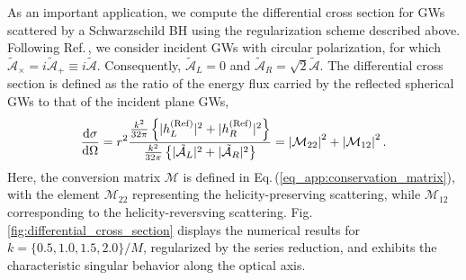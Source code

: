 \documentclass[reprint,amsmath,amssymb,aps,prd]{revtex4-2}
\newcommand{\dd}[0]{\mathrm{d}}
\begin{document}
\begin{widetext}
As an important application, we compute the differential cross section for GWs scattered by a Schwarzschild BH using the regularization scheme described above. Following Ref.\,\cite{Dolan_2008a}, we consider incident GWs with circular polarization, for which $\tilde{\mathcal{A}}_{\times}=i\tilde{\mathcal{A}}_{+}\equiv i\tilde{\mathcal{A}}$. Consequently, $\tilde{\mathcal{A}}_{L}=0$ and $\tilde{\mathcal{A}}_{R}=\sqrt{2}\tilde{\mathcal{A}}$. 
The differential cross section is defined as the ratio of the energy flux carried by the reflected spherical GWs to that of the incident plane GWs,
\begin{equation}
\label{eq_app:differential_cross_section}
\frac{\dd\sigma}{\dd\Omega}
=r^2\frac{\frac{k^2}{32\pi}\left\{ |h_{L}^{\rm(Ref)}|^2+|h_{R}^{\rm(Ref)}|^2\right\}}{\frac{k^2}{32\pi}\left\{|\tilde{\mathcal{A}}_{L}|^2+|\tilde{\mathcal{A}}_{R}|^2\right\}}
=\left|\mathcal{M}_{22}\right|^2+\left|\mathcal{M}_{12}\right|^2.
\end{equation}
Here, the conversion matrix $\bm{\mathcal{M}}$ is defined in Eq.\,(\ref{eq_app:conservation_matrix}), with the element $\mathcal{M}_{22}$ representing the helicity-preserving scattering, while $\mathcal{M}_{12}$ corresponding to the helicity-reversving scattering. Fig.\,\ref{fig:differential_cross_section} displays the numerical results for $k=\{0.5,1.0,1.5,2.0\}/M$, regularized by the series reduction, and exhibits the characteristic singular behavior along the optical axis.




\end{widetext}

\end{document}
